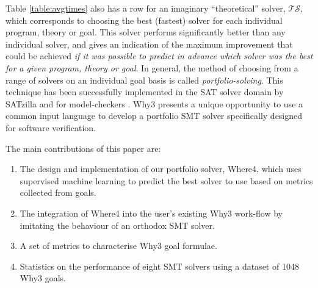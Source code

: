 \documentclass[runningheads,a4paper]{llncs}
\begin{document}
Table \ref{table:avgtimes} also has a row for an imaginary ``theoretical'' solver, $\mathcal{TS}$, which corresponds to choosing the best (fastest) solver for each individual program, theory or goal.  This solver performs significantly better than any individual solver, and gives an indication of the maximum improvement that could be achieved \textit{if it was possible to predict in advance which solver was the best for a given program, theory or goal}.  In general, the method of choosing from a range of solvers on an individual goal basis is called \textit{portfolio-solving}. This technique has been successfully implemented in the SAT solver domain by SATzilla \cite{Satzilla} and for model-checkers \cite{DPVZ15:CAV}\cite{MUX}. \textsf{Why3} presents a unique opportunity to use a common input language to develop a portfolio SMT solver specifically designed for software verification.  

The main contributions of this paper are:
\begin{enumerate}
\item The design  and implementation of our portfolio solver, \textsf{Where4}, which uses supervised machine learning to predict the best solver to use based on metrics collected from goals.
\item The integration of \textsf{Where4} into the user's existing \textsf{Why3} work-flow by imitating the behaviour of an orthodox SMT solver.
\item A set of metrics to characterise \textsf{Why3} goal formulae.
\item Statistics on the performance of eight SMT solvers using a dataset of 1048 \textsf{Why3} goals.

\end{enumerate}

\end{document}
